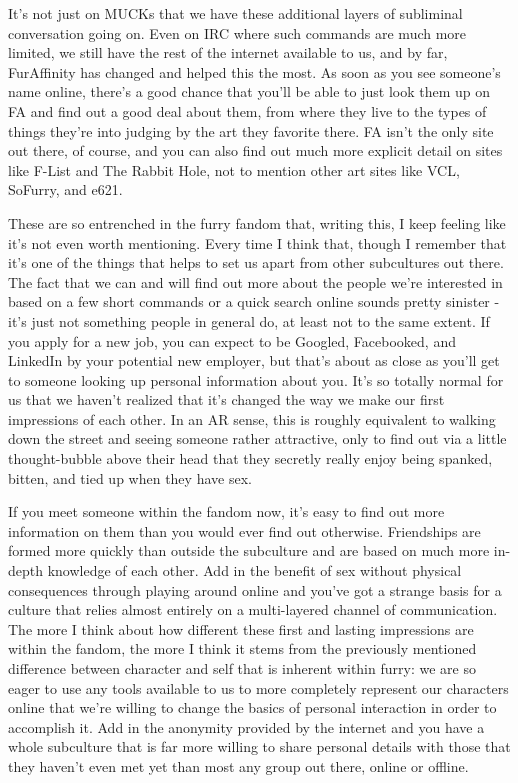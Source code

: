 It's not just on MUCKs that we have these additional layers of subliminal conversation going on. Even on IRC where such commands are much more limited, we still have the rest of the internet available to us, and by far, FurAffinity has changed and helped this the most. As soon as you see someone's name online, there's a good chance that you'll be able to just look them up on FA and find out a good deal about them, from where they live to the types of things they're into judging by the art they favorite there. FA isn't the only site out there, of course, and you can also find out much more explicit detail on sites like F-List and The Rabbit Hole, not to mention other art sites like VCL, SoFurry, and e621.

These are so entrenched in the furry fandom that, writing this, I keep feeling like it's not even worth mentioning. Every time I think that, though I remember that it's one of the things that helps to set us apart from other subcultures out there. The fact that we can and will find out more about the people we're interested in based on a few short commands or a quick search online sounds pretty sinister - it's just not something people in general do, at least not to the same extent. If you apply for a new job, you can expect to be Googled, Facebooked, and LinkedIn by your potential new employer, but that's about as close as you'll get to someone looking up personal information about you. It's so totally normal for us that we haven't realized that it's changed the way we make our first impressions of each other. In an AR sense, this is roughly equivalent to walking down the street and seeing someone rather attractive, only to find out via a little thought-bubble above their head that they secretly really enjoy being spanked, bitten, and tied up when they have sex.

If you meet someone within the fandom now, it's easy to find out more information on them than you would ever find out otherwise. Friendships are formed more quickly than outside the subculture and are based on much more in-depth knowledge of each other. Add in the benefit of sex without physical consequences through playing around online and you've got a strange basis for a culture that relies almost entirely on a multi-layered channel of communication. The more I think about how different these first and lasting impressions are within the fandom, the more I think it stems from the previously mentioned difference between character and self that is inherent within furry: we are so eager to use any tools available to us to more completely represent our characters online that we're willing to change the basics of personal interaction in order to accomplish it. Add in the anonymity provided by the internet and you have a whole subculture that is far more willing to share personal details with those that they haven't even met yet than most any group out there, online or offline.

